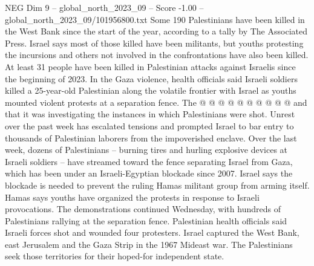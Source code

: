 \begin{textsample}{NEG Dim 9 – global\_north\_2023\_09 – Score -1.00 – global\_north\_2023\_09/101956800.txt}
Some 190 Palestinians have been killed in the West Bank since the start of the year, according to a tally by The Associated Press.
Israel says most of those killed have been militants, but youths protesting the incursions and others not involved in the confrontations have also been killed.
At least 31 people have been killed in Palestinian attacks against Israelis since the beginning of 2023.
In the Gaza violence, health officials said Israeli soldiers killed a 25-year-old Palestinian along the volatile frontier with Israel as youths mounted violent protests at a separation fence.
The @ @ @ @ @ @ @ @ @ @ and that it was investigating the instances in which Palestinians were shot.
Unrest over the past week has escalated tensions and prompted Israel to bar entry to thousands of Palestinian laborers from the impoverished enclave.
Over the last week, dozens of Palestinians -- burning tires and hurling explosive devices at Israeli soldiers -- have streamed toward the fence separating Israel from Gaza, which has been under an Israeli-Egyptian blockade since 2007.
Israel says the blockade is needed to prevent the ruling Hamas militant group from arming itself.
Hamas says youths have organized the protests in response to Israeli provocations.
The demonstrations continued Wednesday, with hundreds of Palestinians rallying at the separation fence.
Palestinian health officials said Israeli forces shot and wounded four protesters.
Israel captured the West Bank, east Jerusalem and the Gaza Strip in the 1967 Mideast war.
The Palestinians seek those territories for their hoped-for independent state.

\end{textsample}
